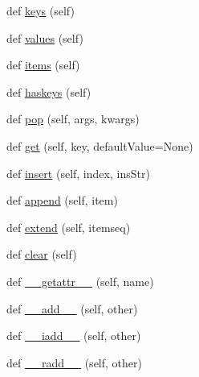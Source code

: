 \begin{DoxyCompactItemize}
\item 
def \hyperlink{classpkg__resources_1_1__vendor_1_1pyparsing_1_1ParseResults_adce91baa521007960c328ffa639d5974}{keys} (self)
\item 
def \hyperlink{classpkg__resources_1_1__vendor_1_1pyparsing_1_1ParseResults_afb27b1e16010219f2a19c5605f5f1163}{values} (self)
\item 
def \hyperlink{classpkg__resources_1_1__vendor_1_1pyparsing_1_1ParseResults_aceab5058e66fab6b91ecb9c1c5044797}{items} (self)
\item 
def \hyperlink{classpkg__resources_1_1__vendor_1_1pyparsing_1_1ParseResults_abad456797bb6927a71aa14ec8f4eae58}{haskeys} (self)
\item 
def \hyperlink{classpkg__resources_1_1__vendor_1_1pyparsing_1_1ParseResults_acc6fbc0292ad831becc3c9506d88099f}{pop} (self, args, kwargs)
\item 
def \hyperlink{classpkg__resources_1_1__vendor_1_1pyparsing_1_1ParseResults_a2ebba8b6bb0c2553f02fa40912e5d830}{get} (self, key, default\+Value=None)
\item 
def \hyperlink{classpkg__resources_1_1__vendor_1_1pyparsing_1_1ParseResults_a15ad117e9b3bda325f66d4fbb68a47f6}{insert} (self, index, ins\+Str)
\item 
def \hyperlink{classpkg__resources_1_1__vendor_1_1pyparsing_1_1ParseResults_a45a5ff7aa33f1c393c793f2751036531}{append} (self, item)
\item 
def \hyperlink{classpkg__resources_1_1__vendor_1_1pyparsing_1_1ParseResults_ab364b8acde3167bcd176f82ea6e1b422}{extend} (self, itemseq)
\item 
def \hyperlink{classpkg__resources_1_1__vendor_1_1pyparsing_1_1ParseResults_a14a75f633961fdc58d077c5d26635038}{clear} (self)
\item 
def \hyperlink{classpkg__resources_1_1__vendor_1_1pyparsing_1_1ParseResults_a6e96811cbc2248c89f58a72e90bb2de3}{\+\_\+\+\_\+getattr\+\_\+\+\_\+} (self, name)
\item 
def \hyperlink{classpkg__resources_1_1__vendor_1_1pyparsing_1_1ParseResults_a306264fe063fadeb4d5cd3e685dbab5a}{\+\_\+\+\_\+add\+\_\+\+\_\+} (self, other)
\item 
def \hyperlink{classpkg__resources_1_1__vendor_1_1pyparsing_1_1ParseResults_ad1b3ef7ea90b9be4f518249c76d4975a}{\+\_\+\+\_\+iadd\+\_\+\+\_\+} (self, other)
\item 
def \hyperlink{classpkg__resources_1_1__vendor_1_1pyparsing_1_1ParseResults_adb34d284e27651c5b931297f972c1982}{\+\_\+\+\_\+radd\+\_\+\+\_\+} (self, other)

\end{DoxyCompactItemize}
